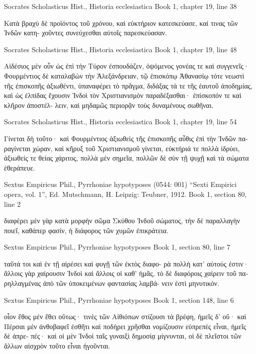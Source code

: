 \documentclass[12pt,letterpaper,twoside,final]{memoir}
\begin{document}
\begin{greek}
Socrates Scholasticus Hist., Historia ecclesiastica 
Book 1, chapter 19, line 38

                                                   Κατὰ βραχὺ δὲ προϊόντος 
τοῦ χρόνου, καὶ εὐκτήριον κατεσκεύασε, καί τινας τῶν Ἰνδῶν κατη-
χοῦντες συνεύχεσθαι αὐτοῖς παρεσκεύασαν. 



Socrates Scholasticus Hist., Historia ecclesiastica 
Book 1, chapter 19, line 48

                                Αἰδέσιος μὲν οὖν ὡς ἐπὶ τὴν Τύρον 
ἐσπουδάζεν, ὀψόμενος γονέας τε καὶ συγγενεῖς· Φουρμέντιος δὲ 
καταλαβὼν τὴν Ἀλεξάνδρειαν, τῷ ἐπισκόπῳ Ἀθανασίῳ τότε 
νεωστὶ τῆς ἐπισκοπῆς ἀξιωθέντι, ὑπαναφέρει τὸ πρᾶγμα, διδάξας 
τά τε τῆς ἑαυτοῦ ἀποδημίας, καὶ ὡς ἐλπίδας ἔχουσιν Ἰνδοὶ τὸν 
Χριστιανισμὸν παραδέξασθαι· ἐπίσκοπόν τε καὶ κλῆρον ἀποστέλ-
λειν, καὶ μηδαμῶς περιορᾷν τοὺς δυναμένους σωθῆναι. 



Socrates Scholasticus Hist., Historia ecclesiastica 
Book 1, chapter 19, line 54

                  Γίνεται δὴ τοῦτο· καὶ Φουρμέντιος ἀξιωθεὶς τῆς 
ἐπισκοπῆς αὖθις ἐπὶ τὴν Ἰνδῶν παραγίνεται χώραν, καὶ κῆρυξ 
τοῦ Χριστιανισμοῦ γίνεται, εὐκτήριά τε πολλὰ ἱδρύει, ἀξιωθείς τε 
θείας χάριτος, πολλὰ μὲν σημεῖα, πολλῶν δὲ σὺν τῇ ψυχῇ καὶ τὰ 
σώματα ἐθεράπευε. 



Sextus Empiricus Phil., Pyrrhoniae hypotyposes (0544: 001)
“Sexti Empirici opera, vol. 1”, Ed. Mutschmann, H.
Leipzig: Teubner, 1912.
Book 1, section 80, line 2

                   διαφέρει μὲν γὰρ κατὰ μορφὴν σῶμα 
Σκύθου Ἰνδοῦ σώματος, τὴν δὲ παραλλαγὴν ποιεῖ, καθάπερ 
φασίν, ἡ διάφορος τῶν χυμῶν ἐπικράτεια. 



Sextus Empiricus Phil., Pyrrhoniae hypotyposes 
Book 1, section 80, line 7

     ταῦτά τοι καὶ ἐν τῇ αἱρέσει καὶ φυγῇ τῶν ἐκτὸς διαφο-
ρὰ πολλὴ κατ' αὐτούς ἐστιν· ἄλλοις γὰρ χαίρουσιν Ἰνδοὶ 
καὶ ἄλλοις οἱ καθ' ἡμᾶς, τὸ δὲ διαφόροις χαίρειν τοῦ 
παρηλλαγμένας ἀπὸ τῶν ὑποκειμένων φαντασίας λαμβά-
νειν ἐστὶ μηνυτικόν. 



Sextus Empiricus Phil., Pyrrhoniae hypotyposes 
Book 1, section 148, line 6

οἷον ἔθος μὲν ἔθει οὕτως· τινὲς τῶν Αἰθιόπων στίζουσι τὰ 
βρέφη, ἡμεῖς δ' οὔ· καὶ Πέρσαι μὲν ἀνθοβαφεῖ ἐσθῆτι καὶ 
ποδήρει χρῆσθαι νομίζουσιν εὐπρεπὲς εἶναι, ἡμεῖς δὲ ἀπρε-
πές· καὶ οἱ μὲν Ἰνδοὶ ταῖς γυναιξὶ δημοσίᾳ μίγνυνται, οἱ δὲ 
πλεῖστοι τῶν ἄλλων αἰσχρὸν τοῦτο εἶναι ἡγοῦνται. 




\end{greek}
\end{document}

